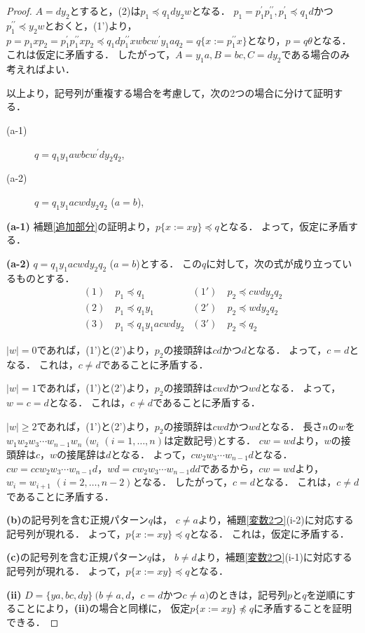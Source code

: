 \begin{proof}
$A=dy_{2}$とすると，(2)は$p_{1} \preceq q_{1}dy_{2}w$となる．
$p_{1}=p^{\prime}_{1}p^{\prime\prime}_{1}, p^{\prime}_{1} \preceq q_{1}d$かつ$p^{\prime\prime}_{1} \preceq y_{2}w$とおくと，(1')より，$p=p_{1}xp_{2}=p^{\prime}_{1}p^{\prime\prime}_{1}xp_{2} \preceq q_{1}dp^{\prime\prime}_{1}xwbcw^{\prime}y_{1}aq_{2}=q \{ x:=p^{\prime\prime}_{1}x \}$となり，$p=q\theta$となる．
これは仮定に矛盾する．
したがって，$A=y_{1}a,B=bc,C=dy_{2}$である場合のみ考えればよい．

以上より，記号列が重複する場合を考慮して，次の2つの場合に分けて証明する．

\begin{description}
\item[(a-1)] $q=q_{1}y_{1}awbcw^{\prime}dy_{2}q_{2}$,
\item[(a-2)] $q=q_{1}y_{1}acwdy_{2}q_{2}$ ($a=b$),
\end{description}

\textbf{(a-1)}
補題\ref{追加部分}の証明より，$p \{ x:= xy \} \preceq q$となる．
よって，仮定に矛盾する．

\textbf{(a-2)}
$q=q_{1}y_{1}acwdy_{2}q_{2}$ ($a=b$)とする．
この$q$に対して，次の式が成り立っているものとする．
\begin{align*}
(1)~& p_{1} \preceq q_{1} & (1')~& p_{2} \preceq cwdy_{2}q_{2} \\
(2)~& p_{1} \preceq q_{1}y_{1} & (2')~& p_{2} \preceq wdy_{2}q_{2} \\
(3)~& p_{1} \preceq q_{1}y_{1}acwdy_{2} & (3')~& p_{2} \preceq q_{2}
\end{align*}

$|w|=0$であれば，(1')と(2')より，$p_{2}$の接頭辞は$cd$かつ$d$となる．
よって，$c=d$となる．
これは，$c \not = d$であることに矛盾する．

$|w|=1$であれば，(1')と(2')より，$p_{2}$の接頭辞は$cwd$かつ$wd$となる．
よって，$w=c=d$となる．
これは，$c \not = d$であることに矛盾する．

$|w| \ge 2$であれば，(1')と(2')より，$p_{2}$の接頭辞は$cwd$かつ$wd$となる．
長さ$n$の$w$を$w_{1}w_{2}w_{3} \cdots w_{n-1}w_{n}$ $(w_{i}$ $(i=1, \ldots , n)は定数記号)$とする．
$cw=wd$より，$w$の接頭辞は$c$，$w$の接尾辞は$d$となる．
よって，$cw_{2}w_{3} \cdots w_{n-1}d$となる．
$cw=ccw_{2}w_{3} \cdots w_{n-1}d，wd=cw_{2}w_{3} \cdots w_{n-1}dd$であるから，$cw=wd$より，$w_{i}=w_{i+1}$ $(i=2, \ldots , n-2)$となる．
したがって，$c=d$となる．
これは，$c \not = d$であることに矛盾する．

\textbf{(b)}の記号列を含む正規パターン$q$は，
$c \not = a$より，補題\ref{変数2つ}(i-2)に対応する記号列が現れる．
よって，$p \{ x:= xy \} \preceq q$となる．
これは，仮定に矛盾する．

\textbf{(c)}の記号列を含む正規パターン$q$は，
$b \not = d$より，補題\ref{変数2つ}(i-1)に対応する記号列が現れる．
よって，$p \{ x:= xy \} \preceq q$となる．

\noindent\textbf{(ii)}
$D=\{ ya, bc, dy \} \ (b \not = a,d，c = d$かつ$c \not = a)$のときは，記号列$p$と$q$を逆順にすることにより，\textbf{(ii)}の場合と同様に， 仮定$p \{ x := xy \} \not\preceq q$に矛盾することを証明できる．
\end{proof}

